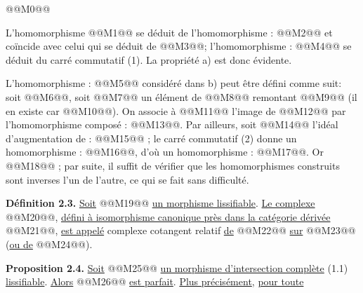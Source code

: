 
@@M0@@

L'homomorphisme @@M1@@ se déduit de l'homomorphisme : @@M2@@ et coïncide avec celui qui se déduit de @@M3@@; l'homomorphisme : @@M4@@ se déduit du carré commutatif (1). La propriété a) est donc évidente.

L'homomorphisme : @@M5@@ considéré dans b) peut être défini comme suit: soit @@M6@@, soit @@M7@@ un élément de @@M8@@ remontant @@M9@@ (il en existe car @@M10@@). On associe à @@M11@@ l'image de @@M12@@ par l'homomorphisme composé : @@M13@@. Par ailleurs, soit @@M14@@ l'idéal d'augmentation de : @@M15@@ ; le carré commutatif (2) donne un homomorphisme : @@M16@@, d'où un homomorphisme : @@M17@@. Or @@M18@@ ; par suite, il suffit de vérifier que les homomorphismes construits sont inverses l'un de l'autre, ce qui se fait sans difficulté.

\textbf{Définition 2.3.} \uline{Soit} @@M19@@ \uline{un morphisme lissifiable}. \uline{Le complexe} @@M20@@, \uline{défini à isomorphisme canonique près dans la catégorie dérivée} @@M21@@, \uline{est appelé} complexe cotangent relatif \uline{de} @@M22@@ \uline{sur} @@M23@@ (\uline{ou de} @@M24@@).

\textbf{Proposition 2.4.} \uline{Soit} @@M25@@ \uline{un morphisme d'intersection complète} (1.1) \uline{lissifiable}. \uline{Alors} @@M26@@ \uline{est parfait}. \uline{Plus précisément}, \uline{pour toute}
